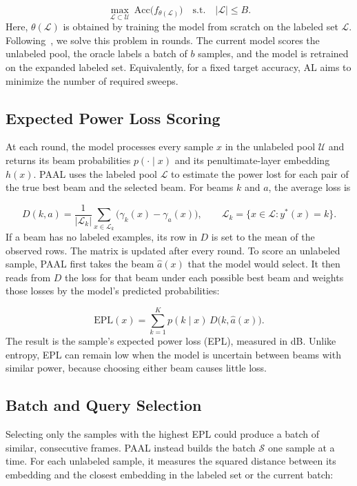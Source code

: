\documentclass[journal,onecolumn]{IEEEtran}
\begin{document}
\begin{equation}
  \max_{\mathcal{L} \subset \mathcal{U}} \ \mathrm{Acc}\big(f_{\theta(\mathcal{L})}\big) \quad \text{s.t.} \quad |\mathcal{L}| \le B.
  \label{eq:al}
\end{equation}
Here, $\theta(\mathcal{L})$ is obtained by training the model from scratch on the labeled set $\mathcal{L}$. Following~\cite{soltani2024learning}, we solve this problem in rounds. The current model scores the unlabeled pool, the oracle labels a batch of $b$ samples, and the model is retrained on the expanded labeled set. Equivalently, for a fixed target accuracy, AL aims to minimize the number of required sweeps.

\subsection{Expected Power Loss Scoring}
At each round, the model processes every sample $x$ in the unlabeled pool $\mathcal{U}$ and returns its beam probabilities $p(\cdot \mid x)$ and its penultimate-layer embedding $h(x)$. PAAL uses the labeled pool $\mathcal{L}$ to estimate the power lost for each pair of the true best beam and the selected beam. For beams $k$ and $a$, the average loss is

\begin{equation}
  D(k,a) = \frac{1}{|\mathcal{L}_k|} \sum_{x \in \mathcal{L}_k} \big(\gamma_k(x) - \gamma_a(x)\big),
  \qquad \mathcal{L}_k = \{x \in \mathcal{L} : y^{*}(x) = k\}.
  \label{eq:D}
\end{equation}
If a beam has no labeled examples, its row in $D$ is set to the mean of the observed rows. The matrix is updated after every round. To score an unlabeled sample, PAAL first takes the beam $\hat a(x)$ that the model would select. It then reads from $D$ the loss for that beam under each possible best beam and weights those losses by the model's predicted probabilities:

\begin{equation}
  \mathrm{EPL}(x) = \sum_{k=1}^{K} p(k \mid x)\, D\big(k, \hat a(x)\big).
  \label{eq:epl}
\end{equation}
The result is the sample's expected power loss (EPL), measured in dB. Unlike entropy, EPL can remain low when the model is uncertain between beams with similar power, because choosing either beam causes little loss.

\subsection{Batch and Query Selection}
Selecting only the samples with the highest EPL could produce a batch of similar, consecutive frames. PAAL instead builds the batch $\mathcal{S}$ one sample at a time. For each unlabeled sample, it measures the squared distance between its embedding and the closest embedding in the labeled set or the current batch:
\end{document}
